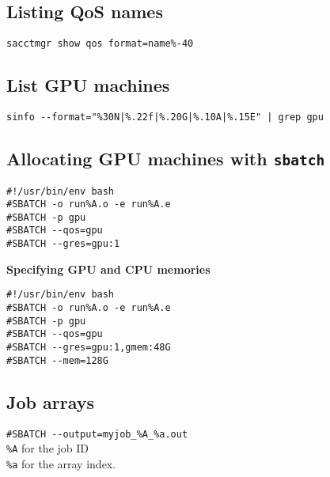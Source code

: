 \subsection{Listing QoS names}
\verb|sacctmgr show qos format=name%-40|

\subsection{List GPU machines}
\verb!sinfo --format="%30N|%.22f|%.20G|%.10A|%.15E" | grep gpu!

\subsection{Allocating GPU machines with \texttt{sbatch}}
\begin{verbatim}
#!/usr/bin/env bash
#SBATCH -o run%A.o -e run%A.e
#SBATCH -p gpu
#SBATCH --qos=gpu
#SBATCH --gres=gpu:1
\end{verbatim}

\textbf{Specifying GPU and CPU memories}\\
\begin{verbatim}
#!/usr/bin/env bash
#SBATCH -o run%A.o -e run%A.e
#SBATCH -p gpu
#SBATCH --qos=gpu
#SBATCH --gres=gpu:1,gmem:48G
#SBATCH --mem=128G
\end{verbatim}

\subsection{Job arrays}
\verb|#SBATCH --output=myjob_%A_%a.out|\\
\verb|%A| for the job ID\\
\verb|%a| for the array index.

